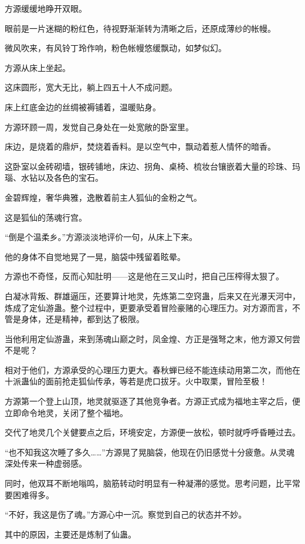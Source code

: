 
\begin{this_body}

方源缓缓地睁开双眼。

眼前是一片迷糊的粉红色，待视野渐渐转为清晰之后，还原成薄纱的帐幔。

微风吹来，有风铃丁玲作响，粉色帐幔悠缓飘动，如梦似幻。

方源从床上坐起。

这床圆形，宽大无比，躺上四五十人不成问题。

床上红底金边的丝绸被褥铺着，温暖贴身。

方源环顾一周，发觉自己身处在一处宽敞的卧室里。

床边，是烧着的鼎炉，焚烧着香料。是以空气中，飘动着惹人情怀的暗香。

这卧室以金砖砌墙，银砖铺地，床边、拐角、桌椅、梳妆台镶嵌着大量的珍珠、玛瑙、水钻以及各色的宝石。

金碧辉煌，奢华典雅，逸散着前主人狐仙的金粉之气。

这是狐仙的荡魂行宫。

“倒是个温柔乡。”方源淡淡地评价一句，从床上下来。

他的身体不自觉地晃了一晃，脑袋中残留着眩晕。

方源也不奇怪，反而心知肚明——这是他在三叉山时，把自己压榨得太狠了。

白凝冰背叛、群雄逼压，还要算计地灵，先炼第二空窍蛊，后来又在光瀑天河中，炼成了定仙游蛊。整个过程中，更要承受着冒险豪赌的心理压力。对方源而言，不管是身体，还是精神，都到达了极限。

当他利用定仙游蛊，来到荡魂山巅之时，凤金煌、方正是强弩之末，他方源又何尝不是呢？

相对于他们，方源承受的心理压力更大。春秋蝉已经不能连续动用第二次，而他在十派蛊仙的面前抢走狐仙传承，等若是虎口拔牙。火中取栗，冒险至极！

方源第一个登上山顶，地灵就驱逐了其他竞争者。方源正式成为福地主宰之后，便立即命令地灵，关闭了整个福地。

交代了地灵几个关健要点之后，环境安定，方源便一放松，顿时就呼呼昏睡过去。

“也不知我这次睡了多久……”方源晃了晃脑袋，他现在仍旧感觉十分疲惫。从灵魂深处传来一种虚弱感。

同时，他双耳不断地嗡鸣，脑筋转动时明显有一种凝滞的感觉。思考问题，比平常要困难得多。

“不好，我这是伤了魂。”方源心中一沉。察觉到自己的状态并不妙。

其中的原因，主要还是炼制了仙蛊。


\end{this_body}
